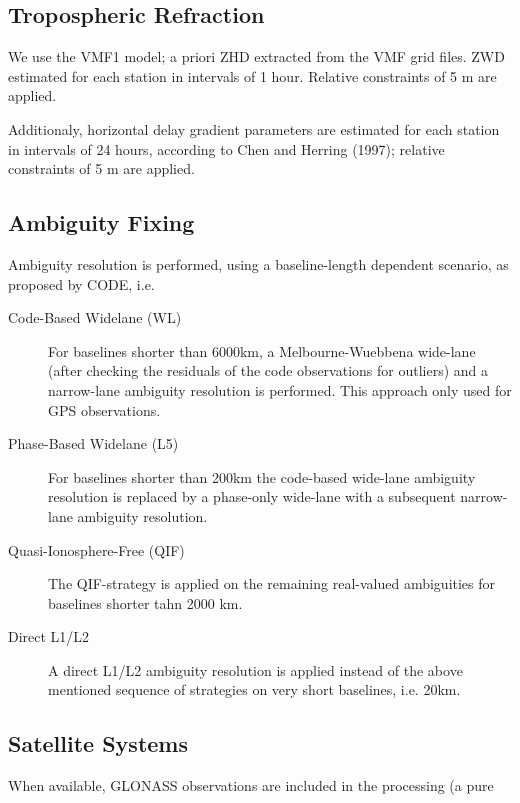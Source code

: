 \documentclass{article}
\begin{document}
\subsection{Tropospheric Refraction}
We use the VMF1 model; a priori ZHD extracted from the VMF grid files. ZWD estimated
for each station in intervals of 1 hour. Relative constraints of 5 m are applied.

Additionaly, horizontal delay gradient parameters are estimated for each station 
in intervals of 24 hours, according to Chen and Herring (1997); relative constraints of
5 m are applied.
\subsection{Ambiguity Fixing}
Ambiguity resolution is performed, using a baseline-length dependent scenario, 
as proposed by CODE, i.e.
\begin{description}
\item[Code-Based Widelane (WL)] 
For baselines shorter than 6000km, a Melbourne-Wuebbena wide-lane (after checking the residuals
of the code observations for outliers) and a narrow-lane ambiguity resolution is performed. This approach only used for GPS observations.
\item[Phase-Based Widelane (L5)] For baselines shorter than
200km the code-based wide-lane ambiguity resolution is replaced by a phase-only wide-lane
with a subsequent narrow-lane ambiguity resolution.
\item[Quasi-Ionosphere-Free (QIF)] The QIF-strategy is applied on the remaining real-valued
ambiguities for baselines shorter tahn 2000 km.
\item[Direct L1/L2] A direct L1/L2 ambiguity resolution is applied instead of
the above mentioned sequence of strategies on very short baselines, i.e. 20km.
\end{description}
\subsection{Satellite Systems}
When available, GLONASS observations are included in the processing (a pure
\clearpage

\printindex
\end{document}
